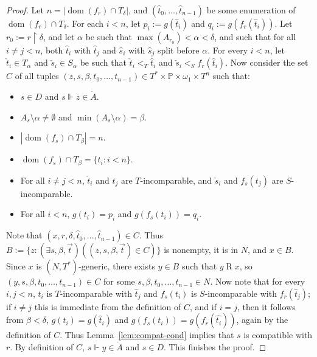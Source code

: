 \documentclass{amsart}
\theoremstyle{definition}
\renewcommand{\P}{\mathbb{P}}
\newcommand{\setm}{\setminus}
\newcommand{\es}{\emptyset}
\newcommand{\res}{\restriction}
\newcommand{\dt}[1]{\dot{#1}}
\newcommand{\forces}{\Vdash}
\newcommand{\ck}[1]{\check{#1}}
\DeclareMathOperator{\dom}{dom}
\begin{document}
\begin{proof}
  Let $n = |\dom(f_{r}) \cap T_{\delta}|$,
  and $(\hat{t}_{0},\dots,\hat{t}_{n-1})$ be some enumeration
  of $\dom(f_{r}) \cap T_{\delta}$. For each
  $i < n$, let
  $p_{i} := g(\hat{t}_{i})$ and $q_{i} := g(f_{r}(\hat{t}_{i}))$.
  Let $r_{0} := r \res \delta$,
  and let $\alpha$ be such that
  $\max(A_{r_{0}}) < \alpha < \delta$, and such that
  for all $i \neq j < n$, both $\hat{t}_{i}$ with $\hat{t}_{j}$
  and $\hat{s}_{i}$ with $\hat{s}_{j}$ split before $\alpha$.
  For every $i < n$, let $\ck{t}_{i} \in T_{\alpha}$ and
  $\ck{s}_{i} \in S_{\alpha}$ be such that $\ck{t}_{i} <_{T} \hat{t}_{i}$ and
  $\ck{s}_{i} <_{S} f_{r}(\hat{t}_{i})$.
  Now consider the set $C$ of all tuples
  $(z,s,\beta,t_{0},\dots,t_{n-1}) \in T^{*} \times \P \times
  \omega_{1} \times T^{n}$ such that:
  \begin{itemize}\itemsep0em
    \item $s \in D$ and $s \forces z \in \dt{A}$.
    \item $A_{s} \setm \alpha \neq \es$ and $\min(A_{s} \setm \alpha) =
    \beta$.
    \item $|\dom(f_{s}) \cap T_{\beta}| = n$.
    \item $\dom(f_{s}) \cap T_{\beta} = \{t_{i} : i < n\}$.
    \item For all $i \neq j < n$, $\ck{t}_{i}$ and $t_{j}$
    are $T$-incomparable,
    and $\ck{s}_{i}$ and $f_{s}(t_{j})$ are $S$-incomparable.
    \item For all $i < n$, $g(t_{i}) = p_{i}$ and
    $g(f_{s}(t_{i})) = q_{i}$.
  \end{itemize}
  Note that $(x,r,\delta,\hat{t}_{0},\dots,
  \hat{t}_{n-1}) \in C$. Thus
  $B:= \{z : (\exists s,\beta,\vec{t})((z,s,\beta,\vec{t})
  \in C)\}$
  is nonempty, it is in $N$, and $x \in B$.
  Since $x$ is
  $(N,T^{*})$-generic, there exists $y \in B$ such that
  $y \mathrel{R} x$, so $(y,s,\beta,t_{0},\dots,t_{n-1}) \in C$
  for some $s,\beta,t_{0},\dots,t_{n-1} \in N$.
  Now note that for every $i,j < n$,
  $t_{i}$ is $T$-incomparable with $\hat{t}_{j}$ and
  $f_{s}(t_{i})$ is $S$-incomparable with $f_{r}({\hat{t}}_{j})$;
  if $i \neq j$ this is immediate from the definition of $C$,
  and if $i = j$, then it follows from $\beta < \delta$,
  $g(t_{i}) = g(\hat{t}_{i})$ and $g(f_{s}(t_{i})) = g(f_{r}(\hat{t_{i}}))$,
  again by the definition of $C$.
  Thus Lemma~\ref{lem:compat-cond} implies that
  $s$ is compatible with $r$. By definition of $C$,
  $s \forces y \in \dt{A}$ and $s \in D$. This finishes the proof.
\end{proof}
\end{document}

